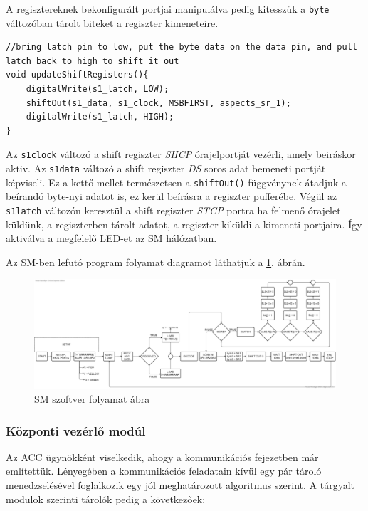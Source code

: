 \documentclass[a4paper,12pt]{article}
\begin{document}
A regisztereknek bekonfigurált portjai manipulálva pedig kitesszük a \texttt{byte} változóban tárolt biteket a regiszter kimeneteire.

\begin{lstlisting}[style=CStyle, caption={Shit regisztert aktiváló kód SM-ben},label=code:sm_shift_update]
//bring latch pin to low, put the byte data on the data pin, and pull latch back to high to shift it out
void updateShiftRegisters(){
	digitalWrite(s1_latch, LOW);
	shiftOut(s1_data, s1_clock, MSBFIRST, aspects_sr_1);
	digitalWrite(s1_latch, HIGH);
}
\end{lstlisting}

Az \texttt{s1clock} változó a shift regiszter \textit{SHCP} órajelportját vezérli, amely beiráskor aktiv. 
Az \texttt{s1data} változó a shift regiszter \textit{DS} soros adat bemeneti portját képviseli.
Ez a kettő mellet természetsen a \texttt{shiftOut()} függvénynek átadjuk a beírandó byte-nyi adatot is, ez kerül beírásra a regiszter pufferébe.
Végül az \texttt{s1latch} változón keresztül a shift regiszter \textit{STCP} portra ha felmenő órajelet küldünk, a regiszterben tárolt adatot, a regiszter kiküldi a kimeneti portjaira. 
Így aktiválva a megfelelő LED-et az SM hálózatban.

Az SM-ben lefutó program folyamat diagramot láthatjuk a \ref{fig:SMflowchart}. ábrán.

\begin{figure}[!htp]
	\includegraphics[width=\linewidth]{images/SM_module_flow_chart.png}
    \caption[SM folyamat ábra]{SM szoftver folyamat ábra}
	\label{fig:SMflowchart}
\end{figure}

\subsubsection{Központi vezérlő modúl}
Az ACC ügynökként viselkedik, ahogy a kommunikációs fejezetben már említettük.
Lényegében a kommunikációs feladatain kívül egy pár tároló menedzselésével foglalkozik egy jól meghatározott algoritmus szerint.
A tárgyalt modulok szerinti tárolók pedig a következőek:
\end{document}
